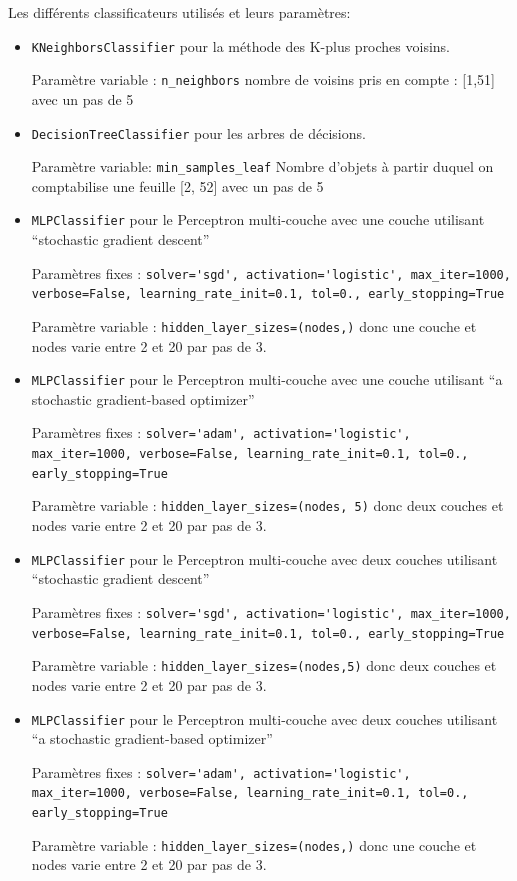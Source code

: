 \documentclass[a4paper,10pt]{article}
\begin{document}
    Les différents classificateurs utilisés et leurs paramètres:
    \begin{itemize}
        \item \verb?KNeighborsClassifier? pour la méthode des K-plus proches voisins.
        
        Paramètre variable : \verb?n_neighbors? nombre de voisins pris en compte : [1,51] avec un pas de 5
        \item \verb?DecisionTreeClassifier? pour les arbres de décisions. 
        
        Paramètre variable: \verb?min_samples_leaf? Nombre d'objets à partir duquel on comptabilise une feuille [2, 52] avec un pas de 5
        \item \verb?MLPClassifier? pour le Perceptron multi-couche avec une couche utilisant ``stochastic gradient descent''
        
        Paramètres fixes : \verb?solver='sgd', activation='logistic', max_iter=1000, verbose=False, learning_rate_init=0.1, tol=0., early_stopping=True?
        
        Paramètre variable : \verb?hidden_layer_sizes=(nodes,)? donc une couche et nodes varie entre 2 et 20 par pas de 3.
        \item \verb?MLPClassifier? pour le Perceptron multi-couche avec une couche utilisant ``a stochastic gradient-based optimizer''
        
        Paramètres fixes : \verb?solver='adam', activation='logistic', max_iter=1000, verbose=False, learning_rate_init=0.1, tol=0., early_stopping=True?
        
        Paramètre variable : \verb?hidden_layer_sizes=(nodes, 5)? donc deux couches et nodes varie entre 2 et 20 par pas de 3.
        \item \verb?MLPClassifier? pour le Perceptron multi-couche avec deux couches utilisant ``stochastic gradient descent''
        
        Paramètres fixes : \verb?solver='sgd', activation='logistic', max_iter=1000, verbose=False, learning_rate_init=0.1, tol=0., early_stopping=True?
        
        Paramètre variable : \verb?hidden_layer_sizes=(nodes,5)? donc deux couches et nodes varie entre 2 et 20 par pas de 3.
        \item \verb?MLPClassifier? pour le Perceptron multi-couche avec deux couches utilisant ``a stochastic gradient-based optimizer''
        
        Paramètres fixes : \verb?solver='adam', activation='logistic', max_iter=1000, verbose=False, learning_rate_init=0.1, tol=0., early_stopping=True?
        
        Paramètre variable : \verb?hidden_layer_sizes=(nodes,)? donc une couche et nodes varie entre 2 et 20 par pas de 3.  
    \end{itemize}
    
\end{document}
